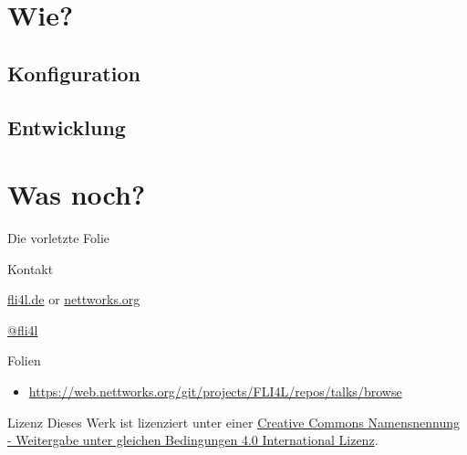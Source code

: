 \documentclass[t]{beamer}
\begin{document}
\section{Wie?}

\subsection{Konfiguration}

\subsection{Entwicklung}

\section*{Was noch?}

\begin{frame}{Die vorletzte Folie}
    \begin{block}{Kontakt}
        \begin{description}[Twitter]
            \item [WWW] \href{https://www.fli4l.de/}{fli4l.de} or
                    \href{https://www.nettworks.org/}{nettworks.org}
            \item [Twitter] \href{https://twitter.com/fli4l}{@fli4l}
        \end{description}
    \end{block}
    \begin{block}{Folien}
        \begin{itemize}
            \item \url{https://web.nettworks.org/git/projects/FLI4L/repos/talks/browse}
        \end{itemize}
    \end{block}
    \begin{block}{Lizenz}
        Dieses Werk ist lizenziert unter einer
        \href{http://creativecommons.org/licenses/by-sa/4.0/}{Creative Commons
        Namensnennung - Weitergabe unter gleichen Bedingungen 4.0 International
        Lizenz}.
    \end{block}
\end{frame}

\end{document}
